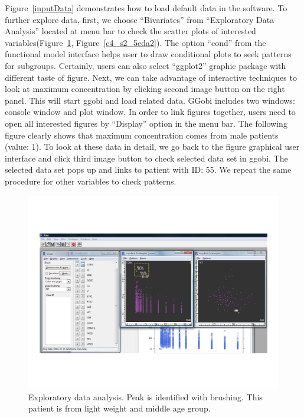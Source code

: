 \documentclass[a4paper]{article}
\begin{document}
Figure~\ref{inputData} demonstrates how to load default data in the software.
\newline
\newline
To further explore data, first, we choose ``Bivariates'' from ``Exploratory Data Analysis'' located at menu bar to check the scatter plots of interested variables(Figure~\ref{c4_s2_5eda1}, Figure~\ref{c4_s2_5eda2}). The option ``cond'' from the functional model interface helps user to draw conditional plots to seek patterns for subgroups. Certainly, users can also select ``ggplot2'' graphic package with different taste of figure. Next, we can take advantage of interactive techniques to look at maximum concentration by clicking second image button on the right panel. This will start ggobi and load related data. GGobi includes two windows: console window and plot window. In order to link figures together, users need to open all interested figures by ``Display'' option in the menu bar. The following figure clearly shows that maximum concentration comes from male patients (value: 1). To look at these data in detail, we go back to the figure graphical user interface and click third image button to check selected data set in ggobi. The selected data set pops up and links to patient with ID: 55. We repeat the same procedure for other variables to check patterns.
\begin{figure}[h!tb]
\centering
\includegraphics[scale=0.6]{c4_s2_5eda1.pdf}
\caption{Exploratory data analysis. Peak is identified with brushing. This patient is from light weight and middle age group.}
\label{c4_s2_5eda1}
\end{figure}
\end{document}
